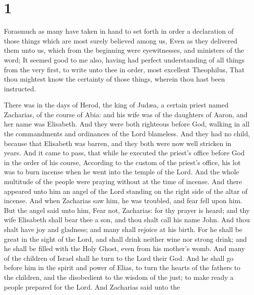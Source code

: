 \hypertarget{section}{%
\section{1}\label{section}}

 Forasmuch as many have taken in hand to set forth in
order a declaration of those things which are most surely believed among
us,  Even as they delivered them unto us, which from the
beginning were eyewitnesses, and ministers of the word; 
It seemed good to me also, having had perfect understanding of all
things from the very first, to write unto thee in order, most excellent
Theophilus,  That thou mightest know the certainty of
those things, wherein thou hast been instructed.

 There was in the days of Herod, the king of Judæa, a
certain priest named Zacharias, of the course of Abia: and his wife was
of the daughters of Aaron, and her name was Elisabeth. 
And they were both righteous before God, walking in all the commandments
and ordinances of the Lord blameless.  And they had no
child, because that Elisabeth was barren, and they both were now well
stricken in years.  And it came to pass, that while he
executed the priest's office before God in the order of his course,
 According to the custom of the priest's office, his lot
was to burn incense when he went into the temple of the Lord.
 And the whole multitude of the people were praying
without at the time of incense.  And there appeared unto
him an angel of the Lord standing on the right side of the altar of
incense.  And when Zacharias saw him, he was troubled,
and fear fell upon him.  But the angel said unto him,
Fear not, Zacharias: for thy prayer is heard; and thy wife Elisabeth
shall bear thee a son, and thou shalt call his name John.
 And thou shalt have joy and gladness; and many shall
rejoice at his birth.  For he shall be great in the sight
of the Lord, and shall drink neither wine nor strong drink; and he shall
be filled with the Holy Ghost, even from his mother's womb.
 And many of the children of Israel shall he turn to the
Lord their God.  And he shall go before him in the spirit
and power of Elias, to turn the hearts of the fathers to the children,
and the disobedient to the wisdom of the just; to make ready a people
prepared for the Lord.  And Zacharias said unto the
